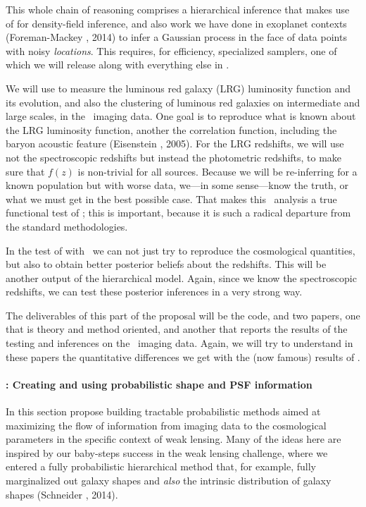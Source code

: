 \documentclass[12pt]{article}
\begin{document}
This whole chain of reasoning comprises a hierarchical inference that
makes use of  for density-field inference, and
also work we have done in exoplanet contexts (Foreman-Mackey \etal, 2014) to infer a
Gaussian process in the face of data points with noisy \emph{locations}.
This requires, for efficiency, specialized samplers, one
of which we will release along with everything else in
.

We will use  to measure the luminous red galaxy
(LRG) luminosity function and its evolution, and also the clustering
of luminous red galaxies on intermediate and large scales, in the
\sdss\ imaging data.
One goal is to reproduce what is known about the LRG luminosity
function, another the correlation function, including the baryon
acoustic feature (Eisenstein \etal, 2005).
For the LRG redshifts, we will use not the spectroscopic redshifts but
instead the photometric redshifts, to make sure that $f(z)$ is
non-trivial for all sources.
Because we will be re-inferring for a known population but with worse
data, we---in some sense---know the truth, or what we must get in the
best possible case.
That makes this \sdss\ analysis a true functional test of
; this is important, because it is such a radical
departure from the standard methodologies.

In the test of  with \sdss\ we can not just try to
reproduce the cosmological quantities, but also to obtain better
posterior beliefs about the redshifts.
This will be another output of the hierarchical model.
Again, since we know the spectroscopic redshifts, we can test these
posterior inferences in a very strong way.

The deliverables of this part of the proposal will be the
 code, and two papers, one that is theory and
method oriented, and another that reports the results of the testing
and inferences on the \sdss\ imaging data.
Again, we will try to understand in these papers the quantitative
differences we get with the (now famous) results of \sdss.

\paragraph{: Creating and using probabilistic shape and PSF information}

In this section propose building tractable probabilistic methods aimed
at maximizing the flow of information from imaging data to the
cosmological parameters in the specific context of weak lensing.
Many of the ideas here are inspired by our baby-steps success in the
 weak lensing challenge, where we entered a fully
probabilistic hierarchical method that, for example, fully marginalized out
galaxy shapes and \emph{also} the intrinsic distribution of galaxy shapes
(Schneider \etal, 2014).
\end{document}
